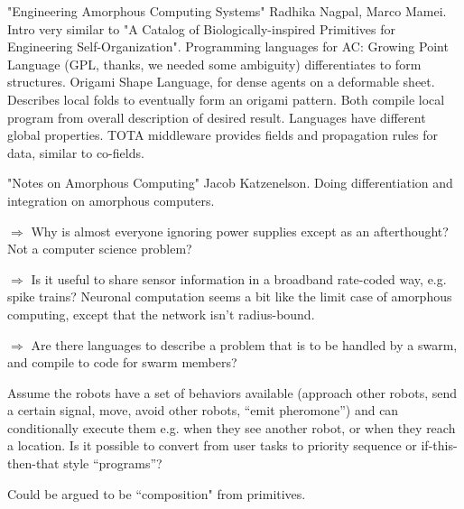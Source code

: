 \documentclass[]{article}
\begin{document}
"Engineering Amorphous Computing Systems" \cite{nagpal2004engineering} Radhika Nagpal, Marco Mamei. Intro very similar to "A Catalog of Biologically-inspired Primitives for Engineering Self-Organization". Programming languages for AC: Growing Point Language (GPL, thanks, we needed some ambiguity) differentiates to form structures. Origami Shape Language, for dense agents on a deformable sheet. Describes local folds to eventually form an origami pattern. Both compile local program from overall description of desired result. Languages have different global properties. TOTA middleware provides fields and propagation rules for data, similar to co-fields. 

"Notes on Amorphous Computing" Jacob Katzenelson. \cite{katzenelson2000notes} Doing differentiation and integration on amorphous computers. 

$\Rightarrow$ Why is almost everyone ignoring power supplies except as an afterthought? Not a computer science problem?

$\Rightarrow$ Is it useful to share sensor information in a broadband rate-coded way, e.g. spike trains? Neuronal computation seems a bit like the limit case of amorphous computing, except that the network isn't radius-bound. 

$\Rightarrow$ Are there languages to describe a problem that is to be handled by a swarm, and compile to code for swarm members?

Assume the robots have a set of behaviors available (approach other robots, send a certain signal, move, avoid other robots, ``emit pheromone'') and can conditionally execute them e.g. when they see another robot, or when they reach a location. Is it possible to convert from user tasks to priority sequence or if-this-then-that style ``programs''?

Could be argued to be ``composition" from primitives.
\end{document}
